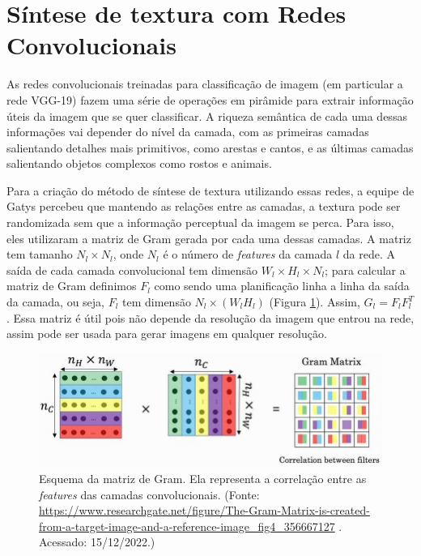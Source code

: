 


\section{Síntese de textura com Redes Convolucionais}

As redes convolucionais
treinadas para classificação de imagem (em particular
a rede VGG-19) fazem uma série de operações em
pirâmide para extrair informação úteis da imagem que
se quer classificar. A riqueza semântica de cada
uma dessas informações vai depender do nível da camada,
com as primeiras camadas salientando detalhes
mais primitivos, como arestas e cantos, e as últimas
camadas salientando objetos complexos como rostos
e animais.


Para a criação do método de síntese de textura
utilizando essas redes, a equipe de Gatys percebeu que 
mantendo as relações entre as camadas,
a textura pode ser randomizada sem que 
a informação perceptual da imagem se perca.
Para isso, eles utilizaram a matriz de Gram gerada por cada
uma dessas camadas. A matriz tem tamanho $N_l \times N_l$,
onde $N_l$ é o número de \textit{features} da camada $l$ da rede.
A saída de cada camada convolucional tem dimensão
$W_l\times H_l \times N_l$; para calcular a matriz de Gram
definimos $F_l$ como sendo uma planificação linha a linha da 
saída da camada, ou seja, $F_l$ tem dimensão $N_l \times (W_l H_l)$
(Figura \ref{gram}). 
Assim, $G_l = F_lF_l^T$. Essa matriz é útil pois não 
depende da resolução da imagem que entrou na rede,
assim pode ser usada para gerar imagens em
qualquer resolução.

\begin{figure}[!ht]
	\centering
	\includegraphics[width=\linewidth*2/3]{files/assets/deeplearning/gram.jpg}
	\caption{Esquema da matriz de Gram. Ela representa a correlação
		entre as \textit{features} das camadas convolucionais. (Fonte:
		\url{https://www.researchgate.net/figure/The-Gram-Matrix-is-created-from-a-target-image-and-a-reference-image_fig4_356667127}
		. Acessado: 15/12/2022.)}
	\label{gram}
\end{figure}


